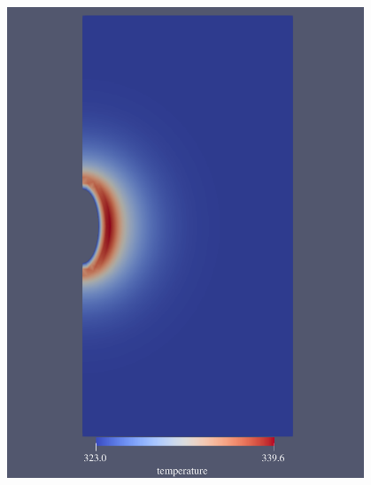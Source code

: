 \begin{figure}[ht!]
{\begin{minipage}{7cm}
            \includegraphics[width=0.95\textwidth]{img/chap5/温度/传统能源储库温度云图.pdf}
        \end{minipage}
    } 
    \subfigure[传统能源储备库等温线图（t=3650d）]
    {
        \begin{minipage}{7cm}
            \centering

\end{minipage}}
\end{figure}
